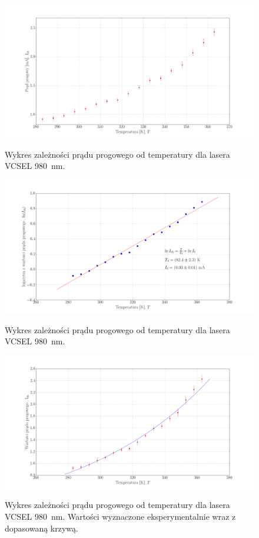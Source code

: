 \documentclass[a4paper, portrait,12pt]{report}
\begin{document}
\begin{figure}
\center
  \includegraphics[scale=0.30]{plot980/plot_temp_i_th_lin.png}
  \label{rys1}
  \caption{Wykres zależności prądu progowego od temperatury dla lasera VCSEL 980\, nm.} 
\end{figure}
\begin{figure}
\center
  \includegraphics[scale=0.30]{plot980/plot_temp_i_th_fit.png}
  \label{rys1}
  \caption{Wykres zależności prądu progowego od temperatury dla lasera VCSEL 980\, nm.} 
\end{figure}
\begin{figure}
\center
  \includegraphics[scale=0.30]{plot980/plot_theory_exp.png}
  \label{rys1}
  \caption{Wykres zależności prądu progowego od temperatury dla lasera VCSEL 980\, nm. Wartości wyznaczone eksperymentalnie wraz z dopasowaną krzywą.} 
\end{figure}
\newpage
\end{document}
